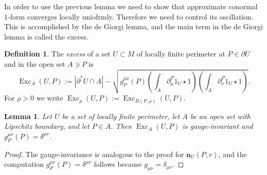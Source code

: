 \documentclass[reqno,10pt]{amsart}
\DeclareMathOperator{\Exc}{Exc}
\newcommand{\normal}{\mathbf n}
\newcommand{\dfn}[1]{\emph{#1}\index{#1}}
\newtheorem{lemma}[theorem]{Lemma}
\theoremstyle{definition}
\newtheorem{definition}[theorem]{Definition}
\numberwithin{equation}{section}
\begin{document}
In order to use the previous lemma we need to show that approximate conormal $1$-form converges locally uniofrmly.
Therefore we need to control its oscillation.
This is accomplished by the de Giorgi lemma, and the main term in the de Giorgi lemma is called the excess.

\begin{definition}
The \dfn{excess} of a set $U \subset M$ of locally finite perimeter at $P \in \partial U$ and in the open set $A \ni P$ is 
$$\Exc_A(U, P) := |\partial^* U \cap A| - \sqrt{g^{\mu\nu}_P(P) \left(\int_A \partial^P_\mu 1_U \star 1\right) \left(\int_A \partial^P_\nu 1_U \star 1\right)}.$$
For $\rho > 0$ we write $\Exc_\rho(U, P) := \Exc_{B(P, \rho)}(U, P)$.
\end{definition}

\begin{lemma}
Let $U$ be a set of locally finite perimeter, let $A$ be an open set with Lipschitz boundary, and let $P \in A$.
Then $\Exc_A(U, P)$ is gauge-invariant and $g^{\mu\nu}_P(P) = \delta^{\mu\nu}$.
\end{lemma}
\begin{proof}
The gauge-invariance is analogous to the proof for $\normal_U(P, r)$, and the computation $g^{\mu\nu}_P(P) = \delta^{\mu\nu}$ follows because $g_{\mu\nu} = \delta_{\mu\nu}$.
\end{proof}
\end{document}
